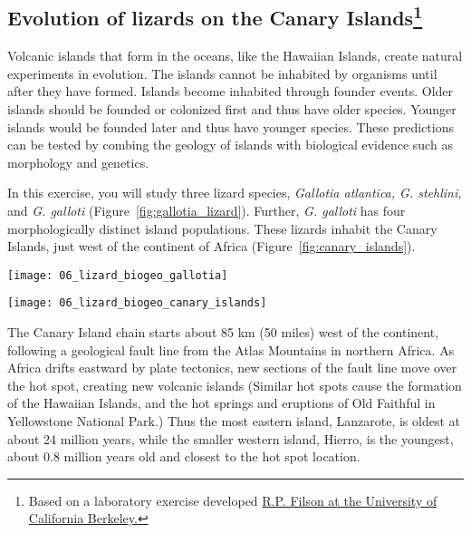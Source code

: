 \documentclass[12pt, hidelinks]{exam}
\begin{document}
\subsection*{Evolution of lizards on the Canary Islands\footnote{Based on a laboratory exercise developed \href{http://www.ucmp.berkeley.edu/fosrec/Filson.html}{R.P. Filson at the University of California Berkeley.}}}

Volcanic islands that form in the oceans, like the Hawaiian Islands, create natural experiments in evolution. The islands cannot be inhabited by organisms until after they have formed. Islands become inhabited through founder events. Older islands should be founded or colonized first and thus have older species. Younger islands would be founded later and thus have younger species. These predictions can be tested by combing the geology of islands with biological evidence such as morphology and genetics.

In this exercise, you will study three lizard species, \textit{Gallotia atlantica, G. stehlini,} and \textit{G. galloti} (Figure~\ref{fig:gallotia_lizard}). Further, \textit{G. galloti} has four morphologically distinct island populations. These lizards inhabit the Canary Islands, just west of the continent of Africa (Figure~\ref{fig:canary_islands}).

\begin{multicols}{2}

	\begin{center}
		\texttt{[image: 06\_lizard\_biogeo\_gallotia]}
		
	\end{center}
\columnbreak
	
	\begin{center}
	
		\texttt{[image: 06\_lizard\_biogeo\_canary\_islands]}
	
	\end{center}
\end{multicols}

The Canary Island chain starts
about 85 km (50 miles) west of the continent, following a geological fault line from
the Atlas Mountains in northern Africa. As Africa drifts eastward by plate tectonics, 
new sections of the fault line move over the hot spot, creating new volcanic islands
 (Similar hot spots cause the formation of the Hawaiian Islands, and the hot springs and eruptions of Old Faithful in Yellowstone National Park.) Thus
the most eastern island, Lanzarote, is oldest at about 24 million years, while the smaller western
island, Hierro, is the youngest, about 0.8 million years old and closest to the hot spot location.
\end{document}
